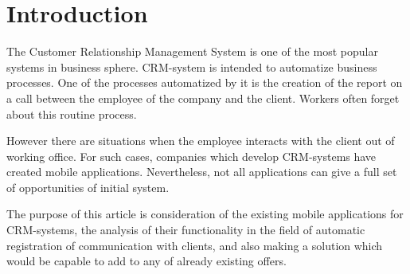 \section{Introduction}
The Customer Relationship Management System is one of the most popular systems in business sphere. CRM-system is intended to automatize business processes. One of the processes automatized by it is the creation of the report on a call between the employee of the company and the client. Workers often forget about this routine process.

However there are situations when the employee interacts with the client out of working office. For such cases, companies which develop CRM-systems have created mobile applications. Nevertheless, not all applications can give a full set of opportunities of initial system.

The purpose of this article is consideration of the existing mobile applications for CRM-systems, the analysis of their functionality in the field of automatic registration of communication with clients, and also making a solution which would be capable to add to any of already existing offers.

